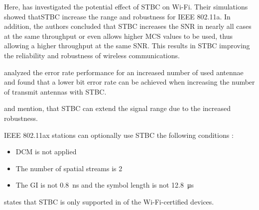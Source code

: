 Here, \textcite{stamoulis_impact_2003} has investigated the potential effect of \ac{STBC} on Wi-Fi.
Their simulations showed that\ac{STBC} increase the range and robustness for IEEE 802.11a.
In addition, the authors concluded that \ac{STBC} increases the \ac{SNR} in nearly all cases at the same throughput or
even allows higher \ac{MCS} values to be used,
thus allowing a higher throughput at the same \ac{SNR}.
This results in \ac{STBC} improving the reliability and robustness of wireless communications.

\textcite{ghosh_error_2014} analyzed the error rate performance for an increased number of used antennae and found
that a lower bit error rate can be achieved
when increasing the number of transmit antennas with \ac{STBC}.

\textcite{gast_80211n_2012} and \textcite{sauter_wireless_2022} mention, that \ac{STBC} can extend the signal range
due to the increased robustness.


IEEE 802.11ax stations can optionally use \ac{STBC} the following conditions \cite{noauthor_ieee_2021}:
\begin{itemize}
	\item DCM is not applied
	\item The number of spatial streams is \num{2}
	\item The \ac{GI} is not \SI{0.8}{\nano\second} and the symbol length is not \SI{12.8}{\micro\second}
\end{itemize}

\textcite{gast_80211n_2012} states that \ac{STBC} is only supported in  of the Wi-Fi-certified devices.

